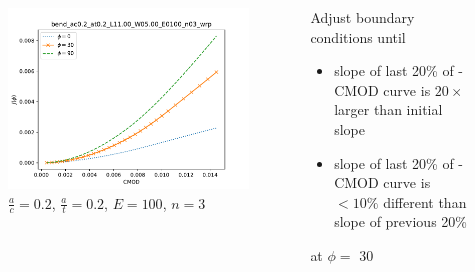 \begin{frame}
\begin{columns}
\begin{column}{0.45\textwidth}
\begin{figure}[tbp]
\centering
\includegraphics[width=0.9\columnwidth]{J_CMOD_bend_ac02_at02_L1100_W0500_E0100_n03_wrp}
\caption{\(\frac{a}{c}=0.2\), \(\frac{a}{t}=0.2\), \(E=100\), \(n=3\)}
\end{figure}
\end{column}
\begin{column}{0.45\textwidth}
Adjust boundary conditions until
\begin{itemize}
\item slope of last 20\% of \J-CMOD curve is \(20\times\) larger than initial slope
\item slope of last 20\% of \J-CMOD curve is \(<10\%\) different than slope of previous 20\%
\end{itemize}
at \(\phi=\) \SI{30}{\SIUnitSymbolDegree}
\end{column}
\end{columns}
\end{frame}


